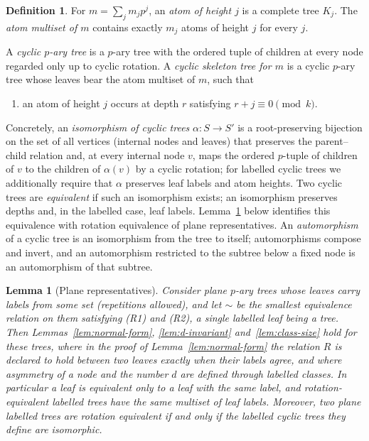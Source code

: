 \documentclass[11pt]{amsart}
\newtheorem{lemma}[theorem]{Lemma}
\theoremstyle{definition}
\newtheorem{definition}[theorem]{Definition}
\theoremstyle{remark}
\begin{document}
\begin{definition}\label{def:skeleton}
For $m=\sum_jm_jp^j$, an \emph{atom of height $j$} is a complete tree $K_j$.  The \emph{atom multiset of $m$} contains exactly $m_j$ atoms of height $j$ for every $j$.

A \emph{cyclic $p$-ary tree} is a $p$-ary tree with the ordered tuple of children at every node regarded only up to cyclic rotation.  A \emph{cyclic skeleton tree for $m$} is a cyclic $p$-ary tree whose leaves bear the atom multiset of $m$, such that
\begin{enumerate}
\item[\textup{(S)}] an atom of height $j$ occurs at depth $r$ satisfying $r+j\equiv0\pmod k$.
\end{enumerate}
Concretely, an \emph{isomorphism of cyclic trees} $\alpha:S\to S'$ is a root-preserving bijection on the set of all vertices (internal nodes and leaves) that preserves the parent--child relation and, at every internal node $v$, maps the ordered $p$-tuple of children of $v$ to the children of $\alpha(v)$ by a cyclic rotation; for labelled cyclic trees we additionally require that $\alpha$ preserves leaf labels and atom heights.  Two cyclic trees are \emph{equivalent} if such an isomorphism exists; an isomorphism preserves depths and, in the labelled case, leaf labels.  Lemma~\ref{lem:plane-cyclic} below identifies this equivalence with rotation equivalence of plane representatives.  An \emph{automorphism} of a cyclic tree is an isomorphism from the tree to itself; automorphisms compose and invert, and an automorphism restricted to the subtree below a fixed node is an automorphism of that subtree.
\end{definition}
\begin{lemma}[Plane representatives]\label{lem:plane-cyclic}
Consider plane $p$-ary trees whose leaves carry labels from some set (repetitions allowed), and let $\sim$ be the smallest equivalence relation on them satisfying (R1) and (R2), a single labelled leaf being a tree.  Then Lemmas~\ref{lem:normal-form}, \ref{lem:d-invariant} and~\ref{lem:class-size} hold for these trees, where in the proof of Lemma~\ref{lem:normal-form} the relation $R$ is declared to hold between two leaves exactly when their labels agree, and where asymmetry of a node and the number $d$ are defined through labelled classes.  In particular a leaf is equivalent only to a leaf with the same label, and rotation-equivalent labelled trees have the same multiset of leaf labels.  Moreover, two plane labelled trees are rotation equivalent if and only if the labelled cyclic trees they define are isomorphic.
\end{lemma}
\end{document}

